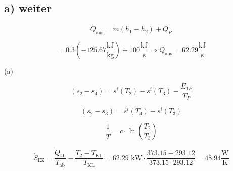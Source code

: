 \subsection*{a) weiter}

\[
\dot{Q}_{\text{aus}} = \dot{m} (h_1 - h_2) + \dot{Q}_R
\]

\[
= 0.3 \left( -125.67 \frac{\text{kJ}}{\text{kg}} \right) + 100 \frac{\text{kJ}}{\text{s}} \Rightarrow \boxed{\dot{Q}_{\text{aus}} = 62.29 \frac{\text{kJ}}{\text{s}}}
\]

(a)
\]

\[
(s_2 - s_4) = s^i (T_2) - s^i (T_3) - \frac{E_{1P}}{T_P}
\]

\[
(s_2 - s_3) = s^i (T_4) - s^i (T_3)
\]

\[
\frac{1}{\overline{T}} = c \cdot \ln \left( \frac{T_2}{T_3} \right)
\]

\[
\dot{S}_{\text{EZ}} = \frac{\dot{Q}_{\text{ab}}}{T_{\text{ab}}} - \frac{T_2 - T_{\text{KL}}}{T_{\text{KL}}} = 62.29 \text{ kW} \cdot \frac{373.15 - 293.12}{373.15 \cdot 293.12} = 48.94 \frac{\text{W}}{\text{K}}
\]